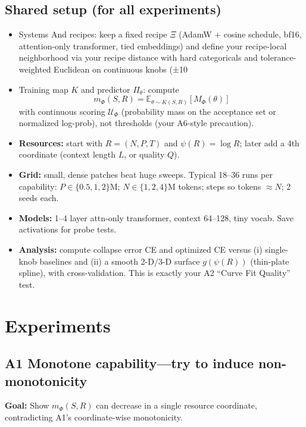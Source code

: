 \documentclass[12pt]{article}
\begin{document}
\subsection{Shared setup (for all experiments)}

\begin{itemize}
    \item Systems And recipes: keep a fixed recipe $\Xi$ (AdamW + cosine schedule, bf16, attention-only transformer, tied embeddings) and define your recipe-local neighborhood via your recipe distance with hard categoricals and tolerance-weighted Euclidean on continuous knobs (±10%
    \item Training map $K$ and predictor $\Pi_\theta$: compute 
    \[
    m_\Phi(S,R)=\mathbb E_{\theta\sim K(S,R)}[M_\Phi(\theta)]
    \]
    with continuous scoring $\mathcal U_\Phi$ (probability mass on the acceptance set or normalized log-prob), not thresholds (your A6-style precaution).
    \item \textbf{Resources:} start with $R=(N,P,T)$ and $\psi(R)=\log R$; later add a 4th coordinate (context length $L$, or quality $Q$).
    \item \textbf{Grid:} small, dense patches beat huge sweeps. Typical 18–36 runs per capability: $P\!\in\!\{0.5,1,2\}$M; $N\!\in\!\{1,2,4\}$M tokens; steps so tokens $\approx N$; 2 seeds each.
    \item \textbf{Models:} 1–4 layer attn-only transformer, context 64–128, tiny vocab. Save activations for probe tests.
    \item \textbf{Analysis:} compute collapse error CE and optimized CE versus (i) single-knob baselines and (ii) a smooth 2-D/3-D surface $g(\psi(R))$ (thin-plate spline), with cross-validation. This is exactly your A2 “Curve Fit Quality” test.
\end{itemize}

\section{Experiments}

\subsection{A1 Monotone capability—try to induce non-monotonicity}

\textbf{Goal:} Show $m_\Phi(S,R)$ can decrease in a single resource coordinate, contradicting A1’s coordinate-wise monotonicity.
\end{document}
